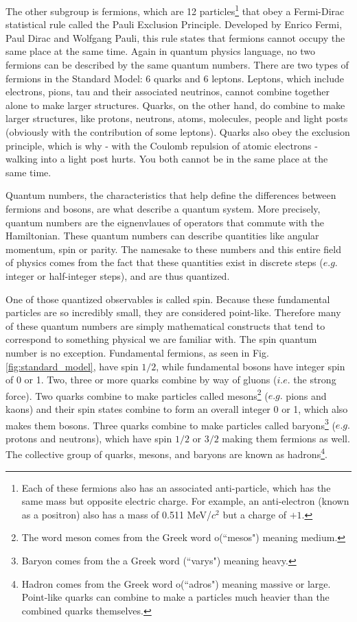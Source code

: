 The other subgroup is fermions, which are 12 particles\footnote{Each of these fermions also has an associated anti-particle, which has the same mass but opposite electric charge. For example, an anti-electron (known as a positron) also has a mass of 0.511 MeV/$c^2$ but a charge of $+1$.} that obey a Fermi-Dirac statistical rule called the Pauli Exclusion Principle. Developed by Enrico Fermi, Paul Dirac and Wolfgang Pauli, this rule states that fermions cannot occupy the same place at the same time. Again in quantum physics language, no two fermions can be described by the same quantum numbers. There are two types of fermions in the Standard Model: 6 quarks and 6 leptons. Leptons, which include electrons, pions, tau and their associated neutrinos, cannot combine together alone to make larger structures. Quarks, on the other hand, do combine to make larger structures, like protons, neutrons, atoms, molecules, people and light posts (obviously with the contribution of some leptons). Quarks also obey the exclusion principle, which is why - with the Coulomb repulsion of atomic electrons - walking into a light post hurts. You both cannot be in the same place at the same time.

Quantum numbers, the characteristics that help define the differences between fermions and bosons, are what describe a quantum system. More precisely, quantum numbers are the eignenvlaues of operators that commute with the Hamiltonian. These quantum numbers can describe quantities like angular momentum, spin or parity. The namesake to these numbers and this entire field of physics comes from the fact that these quantities exist in discrete steps ($e.g.$ integer or half-integer steps), and are thus quantized.

One of those quantized observables is called spin. Because these fundamental particles are so incredibly small, they are considered point-like. Therefore many of these quantum numbers are simply mathematical constructs that tend to correspond to something physical we are familiar with. The spin quantum number is no exception. Fundamental fermions, as seen in Fig. \ref{fig:standard_model}, have spin $1/2$, while fundamental bosons have integer spin of 0 or 1. Two, three or more quarks combine by way of gluons ($i.e.$ the strong force). Two quarks combine to make particles called mesons\footnote{The word meson comes from the Greek word \textmu \textepsilon \textsigma o\textsigma  (``mesos") meaning medium.}  ($e.g.$ pions and kaons) and their spin states combine to form an overall integer 0 or 1, which also makes them bosons. Three quarks combine to make particles called baryons\footnote{Baryon comes from the a Greek word \textbeta \textalpha \textrho \textupsilon \textsigma (``varys") meaning heavy.} ($e.g.$ protons and neutrons), which have spin $1/2$ or $3/2$ making them fermions as well. The collective group of quarks, mesons, and baryons are known as hadrons\footnote{Hadron comes from the Greek word  \textalpha \textdelta \textrho o\textsigma (``adros") meaning massive or large. Point-like quarks can combine to make a particles much heavier than the combined quarks themselves.}.

